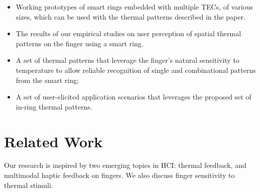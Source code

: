 \documentclass[preprint,12pt]{elsarticle}
\begin{document}



\begin{itemize}
\item Working prototypes of smart rings embedded with multiple TECs, of various sizes, which can be used with the thermal patterns described in the paper.
\item The results of our empirical studies on user perception of spatial thermal patterns on the finger using a smart ring.
\item A set of thermal patterns that leverage the finger's natural sensitivity to temperature to allow reliable recognition of single and combinational patterns from the smart ring;
\item A set of user-elicited application scenarios that leverages the proposed set of in-ring thermal patterns.%
\end{itemize}

\section{Related Work}
Our research is inspired by two emerging topics in HCI: thermal feedback, and multimodal haptic feedback on fingers.
We also discuss finger sensitivity to thermal stimuli.
\end{document}
